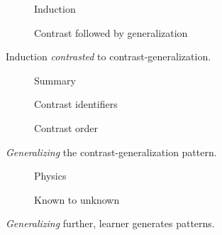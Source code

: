 \begin{frame}
  \begin{figure}
    \begin{subfigure}{0.3\columnwidth}
      \caption{Induction}
    \end{subfigure}
    \begin{subfigure}{0.6\columnwidth}
      \hfill
      \caption{Contrast followed by generalization}
    \end{subfigure}
    \caption{Induction \emph{contrasted} to contrast-generalization.}
  \end{figure}
\end{frame}

\begin{frame}
  \begin{figure}
    \begin{subfigure}{0.3\columnwidth}
      \caption{Summary}
    \end{subfigure}
    \begin{subfigure}{0.6\columnwidth}
      \caption{Contrast identifiers}
    \end{subfigure}
    \begin{subfigure}{0.6\columnwidth}
      \caption{Contrast order}
    \end{subfigure}
    \caption{\emph{Generalizing} the contrast-generalization pattern.}
  \end{figure}
\end{frame}

\begin{frame}
  \begin{figure}
    \begin{subfigure}{0.3\columnwidth}
      \caption{Physics}
    \end{subfigure}
    \begin{subfigure}{0.3\columnwidth}
      \caption{Known to unknown}
    \end{subfigure}
    \caption{\emph{Generalizing} further, learner generates patterns.}
  \end{figure}
\end{frame}

